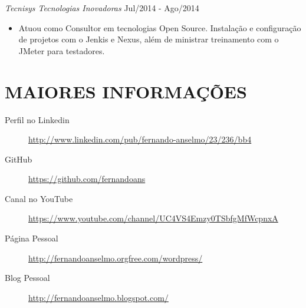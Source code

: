 \documentclass{res}
\begin{document}
\begin{resume}
		{\sl Tecnisys Tecnologias Inovadoras} \hfill Jul/2014 - Ago/2014
		\begin{itemize}
			\item Atuou como Consultor em tecnologias Open Source. Instalação e configuração de projetos com o Jenkis e Nexus, além de ministrar treinamento com o JMeter para testadores.
		\end{itemize}
		
		\section{MAIORES INFORMAÇÕES}
		\vspace{18pt} 
		\begin{description}
			\item[Perfil no Linkedin] \url{http://www.linkedin.com/pub/fernando-anselmo/23/236/bb4}
			\item[GitHub] \url{https://github.com/fernandoans}
			\item[Canal no YouTube] \url{https://www.youtube.com/channel/UC4VS4Emzy0TSbfgMfWcpnxA}
			\item[Página Pessoal] \url{http://fernandoanselmo.orgfree.com/wordpress/}
			\item[Blog Pessoal] \url{http://fernandoanselmo.blogspot.com/}
		\end{description}
	\end{resume} 
\end{document}

